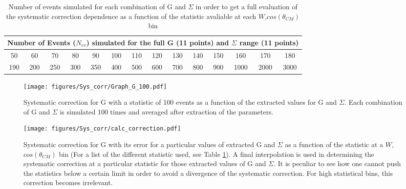 \begin{table}
  \begin{center}
    \begin{tabular}{ ||c|c|c|c|c|c|c|c|c|c|c|c|c|c||}
      \hline
      \multicolumn{14}{|c|}{Number of Events ($N_{ev}$) simulated for the full G (11 points) and $\Sigma$ range (11 points)  } \\
      \hline
      \hline
      50&60&70&80&90&100&110&120&130&140&150&160&170&180\\
      \hline
      190&200&250&300&350&400&500&600&700&800&900&1000&2000&3000 \\
      \hline
    \end{tabular}
  \end{center}
  \caption{Number of events simulated for each combination of G and $\Sigma$ in order to get a full evaluation of the systematic correction dependence as a function of the statistic avaliable at each $W$,$cos(\theta_{CM})$ bin}
  \label{table:sim_nevents}
\end{table}


\begin{figure}[htb]
  \begin{center}
    \texttt{[image: figures/Sys\_corr/Graph\_G\_100.pdf]} \\
    \caption{Systematic correction for G with a statistic of 100 events as a function of the extracted values for G and $\Sigma$. Each combination of G and $\Sigma$ is simulated 100 times and averaged after extraction of the parameters. }
    \label{fig:sys_correction_100}
  \end{center}
\end{figure}
\begin{figure}[htb]
  \begin{center}
    \texttt{[image: figures/Sys\_corr/calc\_correction.pdf]} \\
    \caption{Systematic correction for G with its error for a particular values of extracted G and $\Sigma$ as a function of the statistic at a $W$,$cos(\theta_{CM})$ bin (For a list of the different statistic used, see Table \ref{table:sim_nevents}). A final interpolation is used in determining the systematic correction at a particular statistic for those extracted values of G and $\Sigma$. It is peculiar to see how one cannot push the statistics below a certain limit in order to avoid a divergence of the systematic correction. For high statistical bins, this correction becomes irrelevant. }
    \label{fig:calc_sys_correction}
  \end{center}
\end{figure}

